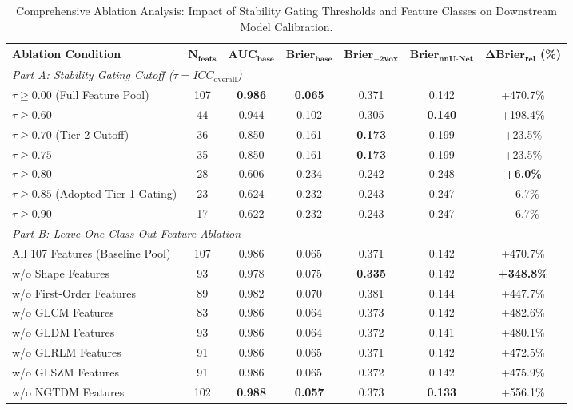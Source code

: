 \begin{table}[htbp]
\centering
\caption{Comprehensive Ablation Analysis: Impact of Stability Gating Thresholds and Feature Classes on Downstream Model Calibration.}
\label{tab:ablation}
\small
\setlength{\tabcolsep}{4.8pt}
\begin{tabular}{lcccccc}
\toprule
\textbf{Ablation Condition} & $\mathbf{N_{\text{feats}}}$ & $\mathbf{AUC_{\text{base}}}$ & $\mathbf{Brier_{\text{base}}}$ & $\mathbf{Brier_{-2\text{vox}}}$ & $\mathbf{Brier_{\text{nnU-Net}}}$ & $\mathbf{\Delta Brier_{\text{rel}}}$ (\%) \\
\midrule
\multicolumn{7}{l}{\textit{Part A: Stability Gating Cutoff ($\tau = ICC_{\text{overall}}$)}} \\
$\tau \ge 0.00$ (Full Feature Pool) & 107 & \textbf{0.986} & \textbf{0.065} & 0.371 & 0.142 & +470.7\% \\
$\tau \ge 0.60$ & 44 & 0.944 & 0.102 & 0.305 & \textbf{0.140} & +198.4\% \\
$\tau \ge 0.70$ (Tier 2 Cutoff) & 36 & 0.850 & 0.161 & \textbf{0.173} & 0.199 & +23.5\% \\
$\tau \ge 0.75$ & 35 & 0.850 & 0.161 & \textbf{0.173} & 0.199 & +23.5\% \\
$\tau \ge 0.80$ & 28 & 0.606 & 0.234 & 0.242 & 0.248 & \textbf{+6.0\%} \\
$\tau \ge 0.85$ (Adopted Tier 1 Gating) & 23 & 0.624 & 0.232 & 0.243 & 0.247 & +6.7\% \\
$\tau \ge 0.90$ & 17 & 0.622 & 0.232 & 0.243 & 0.247 & +6.7\% \\
\midrule
\multicolumn{7}{l}{\textit{Part B: Leave-One-Class-Out Feature Ablation}} \\
All 107 Features (Baseline Pool) & 107 & 0.986 & 0.065 & 0.371 & 0.142 & +470.7\% \\
w/o Shape Features & 93 & 0.978 & 0.075 & \textbf{0.335} & 0.142 & \textbf{+348.8\%} \\
w/o First-Order Features & 89 & 0.982 & 0.070 & 0.381 & 0.144 & +447.7\% \\
w/o GLCM Features & 83 & 0.986 & 0.064 & 0.373 & 0.142 & +482.6\% \\
w/o GLDM Features & 93 & 0.986 & 0.064 & 0.372 & 0.141 & +480.1\% \\
w/o GLRLM Features & 91 & 0.986 & 0.065 & 0.371 & 0.142 & +472.5\% \\
w/o GLSZM Features & 91 & 0.986 & 0.065 & 0.372 & 0.142 & +475.9\% \\
w/o NGTDM Features & 102 & \textbf{0.988} & \textbf{0.057} & 0.373 & \textbf{0.133} & +556.1\% \\

\end{tabular}
\end{table}
